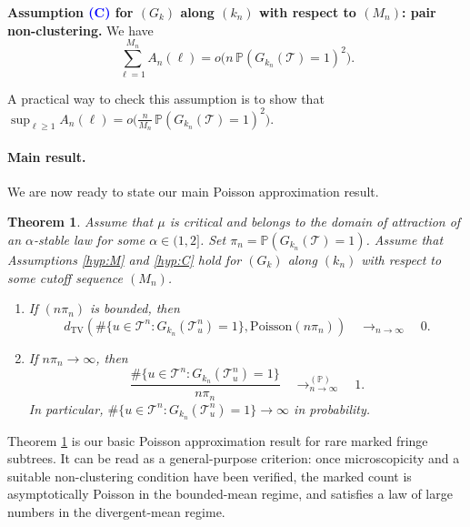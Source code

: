 \documentclass[a4paper,11pt]{article}
\makeatletter
\newcommand{\optionaldesc}[2]{%
  \phantomsection
  #1\protected@edef\@currentlabel{#1}\label{#2}%
}
\newtheorem{theorem}{Theorem}[section]
\DeclareRobustCommand{\P}{\mathbb{P}}
\DeclareRobustCommand{\1}{\mathbf{1}}
\newcommand{\dTV}{d_{\mathrm{TV}}}
\newcommand{\Po}{\mathrm{Poisson}}
\makeatother
\begin{document}
\begin{mdframed}
  \textbf{Assumption \textcolor{blue}{\optionaldesc{(C)}{hyp:C}} for
  $(G_{k})$ along $(k_{n})$ with respect to $(M_{n})$: pair non-clustering.} We have
  $$ \sum_{\ell=1}^{M_n} A_n(\ell)=o\bigl(n\,\P(G_{k_n}(\mathcal T)=1)^2\bigr). $$
\end{mdframed}

A practical way to check this assumption is to show that $
\sup_{\ell\ge1} A_n(\ell)
=
 o \big( \frac{n}{M_{n}}\, \P(G_{k_n}(\mathcal T)=1)^2\big)$.


\paragraph{Main result.} We are now ready to state our main Poisson approximation result. 

\begin{theorem}
\label{thm:PoissonApproximation}
Assume that $\mu$ is critical and belongs to the domain of
attraction of an $\alpha$-stable law for some $\alpha\in(1,2]$.
Set $\pi_n=\P(G_{k_n}(\mathcal T)=1)$. Assume that Assumptions \ref{hyp:M} and \ref{hyp:C} hold for
$(G_k)$ along $(k_n)$ with respect to some cutoff sequence $(M_n)$.
\begin{enumerate}
\item[(i)]  If
$(n\pi_n)$ is bounded, then
\begin{equation}
\label{eq:DTVthm}
\dTV \left( \# \{u \in \mathcal{T}^{n} : G_{k_{n}}( \mathcal{T}^{n}_{u})=1\},\Po(n \pi_{n})\right)  \quad \mathop{\longrightarrow}_{n \rightarrow \infty} \quad 0.
\end{equation}
\item[(ii)]  If
$n\pi_n\to\infty$, then
$$
\frac{
\#\{u\in\mathcal T^n: G_{k_n}(\mathcal T^n_u)=1\}
}{n\pi_n}  \quad \mathop{\longrightarrow}^{(\P)}_{n \rightarrow \infty} \quad 1.$$
In particular,
$
\#\{u\in\mathcal T^n: G_{k_n}(\mathcal T^n_u)=1\} \rightarrow \infty$ in
probability.
\end{enumerate}
\end{theorem}

Theorem \ref{thm:PoissonApproximation} is our basic Poisson approximation
result for rare marked fringe subtrees. It can be read as a general-purpose
criterion: once microscopicity and a suitable non-clustering condition have
been verified, the marked count is asymptotically Poisson in the bounded-mean
regime, and satisfies a law of large numbers in the divergent-mean regime.
\end{document}
